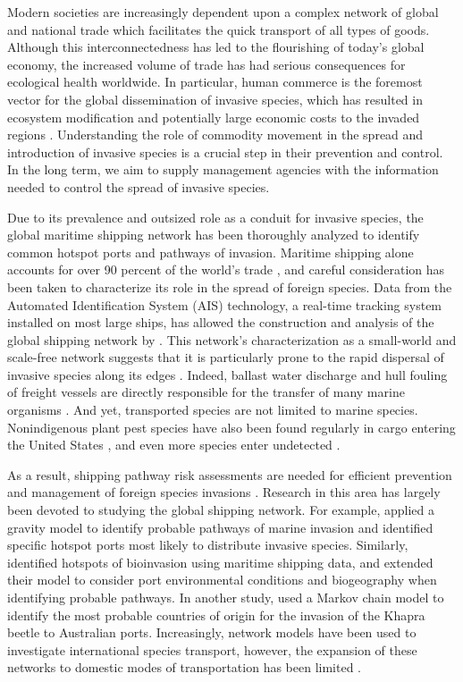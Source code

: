 \documentclass[12pt]{article}
\begin{document}
Modern societies are increasingly dependent upon a complex network of global and national trade which facilitates the quick transport of all types of goods.  Although this interconnectedness has led to the flourishing of today's global economy, the increased volume of trade has had serious consequences for ecological health worldwide.  In particular, human commerce is the foremost vector for the global dissemination of invasive species, which has resulted in ecosystem modification and potentially large economic costs to the invaded regions \citep{Mack2000}.  Understanding the role of commodity movement in the spread and introduction of invasive species is a crucial step in their prevention and control.  In the long term, we aim to supply management agencies with the information needed to control the spread of invasive species.

Due to its prevalence and outsized role as a conduit for invasive species, the global maritime shipping network has been thoroughly analyzed to identify common hotspot ports and pathways of invasion.  Maritime shipping alone accounts for over 90 percent of the world's trade  \citep{Kaluza2009}, and careful consideration has been taken to characterize its role in the spread of foreign species.  Data from the Automated Identification System (AIS) technology, a real-time tracking system installed on most large ships, has allowed the construction and analysis of the global shipping network by  \citet{Kaluza2009}.  This network's characterization as a small-world and scale-free network suggests that it is particularly prone to the rapid dispersal of invasive species along its edges \citep{Pastor2001}.  Indeed, ballast water discharge and hull fouling of freight vessels are directly responsible for the transfer of many marine organisms \citep{Ruiz2000}.  And yet, transported species are not limited to marine species. Nonindigenous plant pest species have also been found regularly in cargo entering the United States \citep{McCullough2006, Work2005}, and even more species enter undetected \citep{Work2005}.

As a result, shipping pathway risk assessments are needed for efficient prevention and management of foreign species invasions \citep{Hulme2009}.  Research in this area has largely been devoted to studying the global shipping network.  For example, \citet{Drake2004} applied a gravity model to identify probable pathways of marine invasion and identified specific hotspot ports most likely to distribute invasive species.   Similarly, \citet{Seebens2013} identified hotspots of bioinvasion using maritime shipping data, and extended their model to consider port environmental conditions and biogeography when identifying probable pathways.  In another study, \citet{Paini2012} used a Markov chain model to identify the most probable countries of origin for the invasion of the Khapra beetle to Australian ports.  Increasingly, network models have been used to investigate international species transport, however, the expansion of these networks to domestic modes of transportation has been limited \citep{Hulme2009}.
\end{document}
